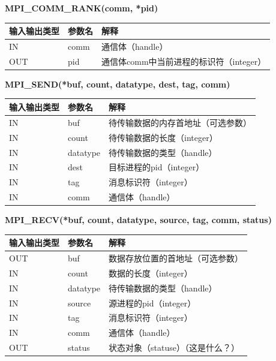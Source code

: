 \documentclass{article}
\begin{document}
					\textbf{MPI\_COMM\_RANK(comm, *pid)}\\
						\begin{table}[H]
							\centering
							\begin{tabular}{lll}
								\hline
								输入输出类型 & 参数名 & 解释\\
								\hline
								IN & comm & 通信体（handle）\\
								OUT & pid & 通信体comm中当前进程的标识符（integer）\\
								\hline
							\end{tabular}
						\end{table}
					\textbf{MPI\_SEND(*buf, count, datatype, dest, tag, comm)}\\
						\begin{table}[H]
							\centering
							\begin{tabular}{lll}
								\hline
								输入输出类型 & 参数名 & 解释\\
								\hline
								IN & buf & 待传输数据的内存首地址（可选参数）\\
								IN & count & 待传输数据的长度（integer）\\
								IN & datatype & 待传输数据的类型（handle）\\
								IN & dest & 目标进程的pid（integer）\\
								IN & tag & 消息标识符（integer）\\
								IN & comm & 通信体（handle）\\
								\hline
							\end{tabular}
						\end{table}
					\textbf{MPI\_RECV(*buf, count, datatype, source, tag, comm, status)}\\
					\begin{table}[H]
						\centering
						\begin{tabular}{lll}
							\hline
							输入输出类型 & 参数名 & 解释\\
							\hline
							OUT & buf & 数据存放位置的首地址（可选参数）\\
							IN & count & 数据的长度（integer）\\
							IN & datatype & 待传输数据的类型（handle）\\
							IN & source & 源进程的pid（integer）\\
							IN & tag & 消息标识符（integer）\\
							IN & comm & 通信体（handle）\\
							OUT & status & 状态对象（statuse）（这是什么？）\\
							\hline
						\end{tabular}
					\end{table}
\end{document}
